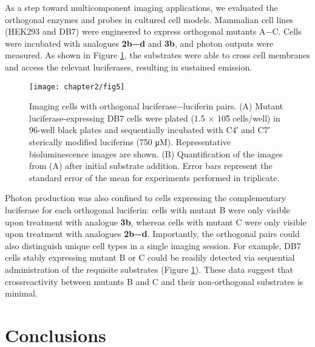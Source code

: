 As a step
toward multicomponent imaging applications, we evaluated the
orthogonal enzymes and probes in cultured cell models.
Mammalian cell lines (HEK293 and DB7) were engineered
to express orthogonal mutants A−C. %
Cells
were incubated with analogues \textbf{2b−d} and \textbf{3b}, and photon
outputs were measured. As shown in Figure \ref{fig:in_vitro}, the substrates
were able to cross cell membranes and access the relevant
luciferases, resulting in sustained emission.
\begin{figure}[htbp]
\texttt{[image: chapter2/fig5]}
\centering
\caption[Imaging cells with orthogonal luciferase−luciferin pairs]{Imaging cells with orthogonal luciferase−luciferin pairs. (A) Mutant luciferase-expressing DB7 cells were plated (1.5 × 10\^{5} cells/well) in
96-well black plates and sequentially incubated with C4′ and C7′ sterically modified luciferins (750 μM). Representative bioluminescence images are
shown. (B) Quantification of the images from (A) after initial substrate addition. Error bars represent the standard error of the mean for experiments
performed in triplicate.}
  \label{fig:in_vitro}
\end{figure}
Photon production
was also confined to cells expressing the complementary
luciferase for each orthogonal luciferin: cells with mutant B
were only visible upon treatment with analogue \textbf{3b}, whereas
cells with mutant C were only visible upon treatment with analogues \textbf{2b−d}.
Importantly, the
orthogonal pairs could also distinguish unique cell types in a
single imaging session. For example, DB7 cells stably expressing
mutant B or C could be readily detected via sequential
administration of the requisite substrates (Figure \ref{fig:in_vitro}).
These data suggest that crossreactivity
between mutants B and C and their non-orthogonal
substrates is minimal.

\section{Conclusions}

